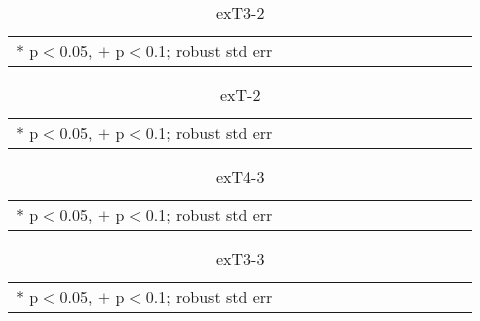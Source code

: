 \documentclass[10pt, letterpaper]{article}
\begin{document}
\begin{spacing}{1.4}
\begin{spacing}{.9} \begin{table}[H]\centering \caption{.} \label{d1} \begin{scriptsize} \begin{tabular}{p{1.8in}p{.5in}p{.5in}p{.5in}p{.5in}p{.5in}p{.5in}p{.5in}p{.5in}p{.5in}p{.5 in}p{.5in}p{.5 in}}\hline  \hline   * p$<$0.05, $+$ p$<$0.1; robust std err \end{tabular}\end{scriptsize}\caption{exT3-2}\end{table} \end{spacing}

\begin{spacing}{.9} \begin{table}[H]\centering \caption{.} \label{d1} \begin{scriptsize} \begin{tabular}{p{1.8in}p{.5in}p{.5in}p{.5in}p{.5in}p{.5in}p{.5in}p{.5in}p{.5in}p{.5in}p{.5 in}p{.5in}p{.5 in}}\hline  \hline   * p$<$0.05, $+$ p$<$0.1; robust std err \end{tabular}\end{scriptsize}\caption{exT-2}\end{table} \end{spacing}


\begin{spacing}{.9} \begin{table}[H]\centering \caption{.} \label{d1} \begin{scriptsize} \begin{tabular}{p{1.8in}p{.5in}p{.5in}p{.5in}p{.5in}p{.5in}p{.5in}p{.5in}p{.5in}p{.5in}p{.5 in}p{.5in}p{.5 in}}\hline  \hline   * p$<$0.05, $+$ p$<$0.1; robust std err \end{tabular}\end{scriptsize}\caption{exT4-3}\end{table} \end{spacing}

\begin{spacing}{.9} \begin{table}[H]\centering \caption{.} \label{d1} \begin{scriptsize} \begin{tabular}{p{1.8in}p{.5in}p{.5in}p{.5in}p{.5in}p{.5in}p{.5in}p{.5in}p{.5in}p{.5in}p{.5 in}p{.5in}p{.5 in}}\hline  \hline   * p$<$0.05, $+$ p$<$0.1; robust std err \end{tabular}\end{scriptsize}\caption{exT3-3}\end{table} \end{spacing}


\end{spacing}
\end{document}
